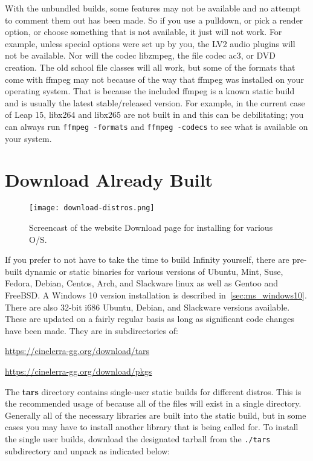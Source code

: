 With the unbundled builds, some features may not be available and
no attempt to comment them out has been made.  So if you use a
pulldown, or pick a render option, or choose something that is not
available, it just will not work.  For example, unless special
options were set up by you, the LV2 audio plugins will not be
available.  Nor will the codec libzmpeg, the file codec ac3, or
DVD creation.  The old school file classes will all work, but some
of the formats that come with ffmpeg may not because of the way
that ffmpeg was installed on your operating system.  That is
because the \CGG{} included ffmpeg is a known static build and is
usually the latest stable/released version.  For example, in the
current case of Leap 15, libx264 and libx265 are not built in and
this can be debilitating; you can always run \texttt{ffmpeg
  -formats} and \texttt{ffmpeg -codecs} to see what is available
on your system.


\section{Download Already Built \CGG{}}%
\label{sec:download_already_built_cinelerra_gg}

\begin{figure}[htpb]
  \centering
  \texttt{[image: download-distros.png]}
  \caption{Screencast of the website Download page for installing \CGG{} for various O/S.}
  \label{fig:download-distros}
\end{figure}

If you prefer to not have to take the time to build \CGG{} Infinity
yourself, there are pre-built dynamic or static binaries for various
versions of Ubuntu, Mint, Suse, Fedora, Debian, Centos, Arch, and
Slackware linux as well as Gentoo and FreeBSD.
%
A Windows 10 version installation is described in~\ref{sec:ms_windows10}.  There are also 32-bit i686 Ubuntu, Debian,
and Slackware versions available.  These are updated on a fairly
regular basis as long as significant code changes have been made.
They are in subdirectories of:

\begin{list}{}{}
\item \href{https://cinelerra-gg.org/download/tars}{https://cinelerra-gg.org/download/tars}
\item \href{https://cinelerra-gg.org/download/pkgs}{https://cinelerra-gg.org/download/pkgs}
\end{list}

The \textbf{tars} directory contains single-user static builds for
different distros.
%
This is the recommended usage of \CGG{} because all of the files
will exist in a single directory.  Generally all of the necessary
libraries are built into the static build, but in some cases you may
have to install another library that is being called for.
%
To install the single user builds, download the designated tarball
from the \texttt{./tars} subdirectory and unpack as indicated below:

